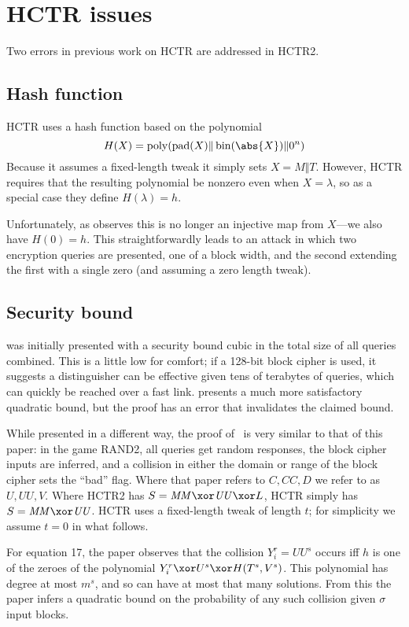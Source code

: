 \documentclass[letterpaper,11pt]{article}
\newcommand*{\Concat}{\Vert}
\newcommand*{\MM}{\mathit{MM}}
\newcommand*{\UU}{\mathit{UU}}
\DeclareMathOperator{\fromint}{bin}
\DeclareMathOperator{\pad}{pad}
\DeclareMathOperator{\poly}{poly}
\begin{document}
\section{HCTR issues}\label{hctrissues}
Two errors in previous work on HCTR are addressed in HCTR2.
\subsection{Hash function}
HCTR uses a hash function based on the polynomial
\begin{displaymath}
    H(X) = \poly(\pad(X) \Concat \fromint(\abs{X}) \Concat 0^n)
\end{displaymath}
Because it assumes a fixed-length tweak it simply sets \(X = M \Concat T\).
However, HCTR requires that the resulting polynomial be nonzero
even when \(X = \lambda\), so as a special case they define
\(H(\lambda) = h\).

Unfortunately, as \cite{kumarhctr} observes this is no longer
an injective map from \(X\)---we also have \(H(0) = h\). This
straightforwardly leads to an attack in which two encryption queries
are presented, one of a block width, and the second extending
the first with a single zero (and assuming a zero length tweak).

\subsection{Security bound}
\cite{hctr} was initially presented with a security bound cubic
in the total size of all queries combined.  This is a little low
for comfort; if a 128-bit block cipher is used, it suggests a
distinguisher can be effective given tens of terabytes of queries,
which can quickly be reached over a fast link. 
\cite{hctrquad} presents a much more satisfactory quadratic bound,
but the proof has an error that invalidates the claimed bound.

While presented in a different way, 
the proof of~\cite{hctrquad} is very similar
to that of this paper: in the game RAND2, all queries get random
responses, the block cipher inputs are inferred, and a collision
in either the domain or range of the block cipher
sets the ``bad'' flag. Where that paper refers to 
\(C, \mathit{CC}, D\)
we refer to as \(U, \UU, V\). Where HCTR2 has
\(S = \MM \xor \UU \xor L\), HCTR simply has
\(S = \MM \xor \UU\). HCTR uses a fixed-length tweak
of length \(t\); for simplicity we assume \(t = 0\)
in what follows.

For equation 17, the paper observes that the collision
\(Y_i^r = \UU^s\) occurs iff \(h\) is one of the zeroes
of the polynomial \(Y_i^r \xor U^s \xor H(T^s, V^s)\).
This polynomial has degree at most
\(m^s\), and so can have
at most that many solutions. From this the paper infers
a quadratic bound on the probability of any such collision
given \(\sigma\) input blocks.
\end{document}
